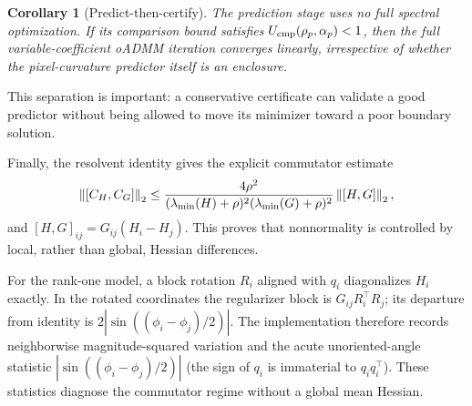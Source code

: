 \documentclass[pdflatex,iicol,sn-mathphys-num]{sn-jnl}
\newtheorem{corollary}[theorem]{Corollary}\newtheorem{assumption}[theorem]{Assumption}
\theoremstyle{definition}\newtheorem{definition}[theorem]{Definition}\newtheorem{remark}[theorem]{Remark}
\begin{document}
\begin{corollary}[Predict-then-certify]\label{cor:predict_certify}
The prediction stage uses no full spectral optimization.  If its comparison bound satisfies $U_{\rm cmp}(\rho_p,\alpha_p)<1$, then the full variable-coefficient oADMM iteration converges linearly, irrespective of whether the pixel-curvature predictor itself is an enclosure.
\end{corollary}
This separation is important: a conservative certificate can validate a good predictor without being allowed to move its minimizer toward a poor boundary solution.

\begin{center}
\end{center}

Finally, the resolvent identity gives the explicit commutator estimate
\[
\left\lVert [C_H,C_G]\right\rVert_2\le
\frac{4\rho^2}{(\lambda_{\min}(H)+\rho)^2(\lambda_{\min}(G)+\rho)^2}
\left\lVert [H,G]\right\rVert_2,
\]
and $[H,G]_{ij}=G_{ij}(H_i-H_j)$.  This proves that nonnormality is controlled by local, rather than global, Hessian differences.

For the rank-one model, a block rotation $R_i$ aligned with $q_i$ diagonalizes $H_i$ exactly.  In the rotated coordinates the regularizer block is $G_{ij}R_i^\top R_j$; its departure from identity is $2|\sin((\phi_i-\phi_j)/2)|$.  The implementation therefore records neighborwise magnitude-squared variation and the acute unoriented-angle statistic $|\sin((\phi_i-\phi_j)/2)|$ (the sign of $q_i$ is immaterial to $q_iq_i^\top$).  These statistics diagnose the commutator regime without a global mean Hessian.
\end{document}
